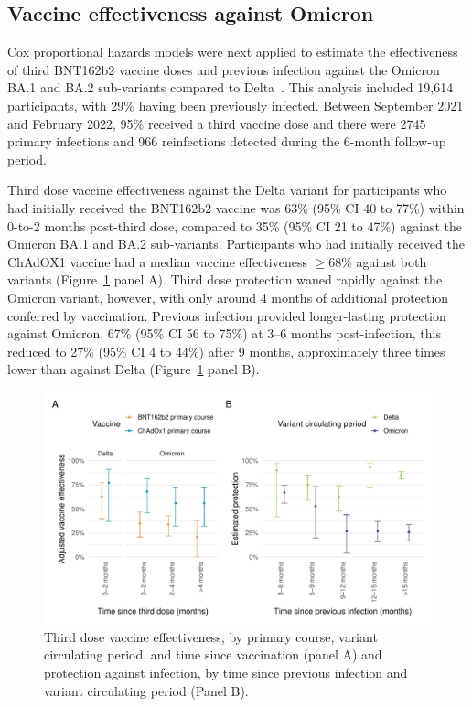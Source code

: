 \subsection{Vaccine effectiveness against Omicron}

Cox proportional hazards models were next applied to estimate the effectiveness of third BNT162b2 vaccine doses and previous infection against the Omicron BA.1 and BA.2 sub-variants compared to Delta~\parencite{Hall2024-ai}. This analysis included 19,614 participants, with 29\% having been previously infected. Between September 2021 and February 2022, 95\% received a third vaccine dose and there were 2745 primary infections and 966 reinfections detected during the 6-month follow-up period.

Third dose vaccine effectiveness against the Delta variant for participants who had initially received the BNT162b2 vaccine was 63\% (95\% CI 40 to 77\%) within 0-to-2 months post-third dose, compared to 35\% (95\% CI 21 to 47\%) against the Omicron BA.1 and BA.2 sub-variants. Participants who had initially received the ChAdOX1 vaccine had a median vaccine effectiveness $\geq$68\% against both variants (Figure~\ref{fig:cox_2} panel A). Third dose protection waned rapidly against the Omicron variant, however, with only around 4 months of additional protection conferred by vaccination. Previous infection provided longer-lasting protection against Omicron, 67\% (95\% CI 56 to 75\%) at 3--6 months post-infection, this reduced to 27\% (95\% CI 4 to 44\%) after 9 months, approximately three times lower than against Delta (Figure~\ref{fig:cox_2} panel B).

\begin{figure}[htbp!]
    \centering
    \includegraphics[width=\textwidth]{cox_2.pdf}
    \caption[Third dose vaccine effectiveness and protection against infection, by primary course, time since previous infection, and variant circulating period]{Third dose vaccine effectiveness, by primary course, variant circulating period, and time since vaccination (panel A) and protection against infection, by time since previous infection and variant circulating period (Panel B).}\label{fig:cox_2}
\end{figure}

